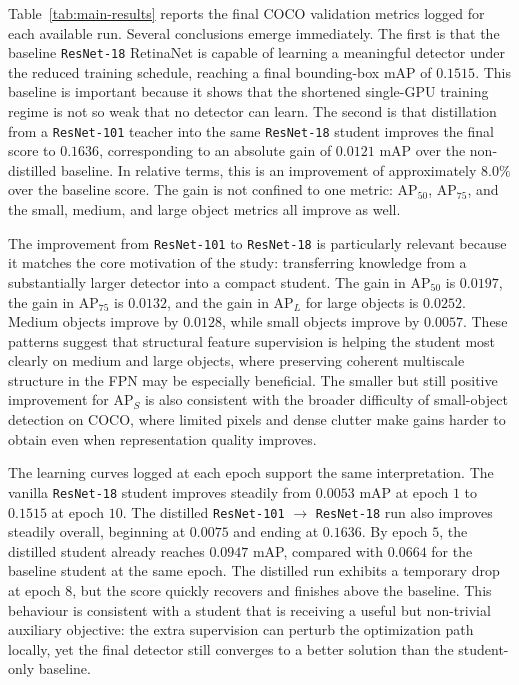 Table~\ref{tab:main-results} reports the final COCO validation metrics logged for each available run. Several conclusions emerge immediately. The first is that the baseline \texttt{ResNet-18} RetinaNet is capable of learning a meaningful detector under the reduced training schedule, reaching a final bounding-box mAP of $0.1515$. This baseline is important because it shows that the shortened single-GPU training regime is not so weak that no detector can learn. The second is that distillation from a \texttt{ResNet-101} teacher into the same \texttt{ResNet-18} student improves the final score to $0.1636$, corresponding to an absolute gain of $0.0121$ mAP over the non-distilled baseline. In relative terms, this is an improvement of approximately $8.0\%$ over the baseline score. The gain is not confined to one metric: AP$_{50}$, AP$_{75}$, and the small, medium, and large object metrics all improve as well.

The improvement from \texttt{ResNet-101} to \texttt{ResNet-18} is particularly relevant because it matches the core motivation of the study: transferring knowledge from a substantially larger detector into a compact student. The gain in AP$_{50}$ is $0.0197$, the gain in AP$_{75}$ is $0.0132$, and the gain in AP$_L$ for large objects is $0.0252$. Medium objects improve by $0.0128$, while small objects improve by $0.0057$. These patterns suggest that structural feature supervision is helping the student most clearly on medium and large objects, where preserving coherent multiscale structure in the FPN may be especially beneficial. The smaller but still positive improvement for AP$_S$ is also consistent with the broader difficulty of small-object detection on COCO, where limited pixels and dense clutter make gains harder to obtain even when representation quality improves.

The learning curves logged at each epoch support the same interpretation. The vanilla \texttt{ResNet-18} student improves steadily from $0.0053$ mAP at epoch $1$ to $0.1515$ at epoch $10$. The distilled \texttt{ResNet-101} $\rightarrow$ \texttt{ResNet-18} run also improves steadily overall, beginning at $0.0075$ and ending at $0.1636$. By epoch $5$, the distilled student already reaches $0.0947$ mAP, compared with $0.0664$ for the baseline student at the same epoch. The distilled run exhibits a temporary drop at epoch $8$, but the score quickly recovers and finishes above the baseline. This behaviour is consistent with a student that is receiving a useful but non-trivial auxiliary objective: the extra supervision can perturb the optimization path locally, yet the final detector still converges to a better solution than the student-only baseline.

